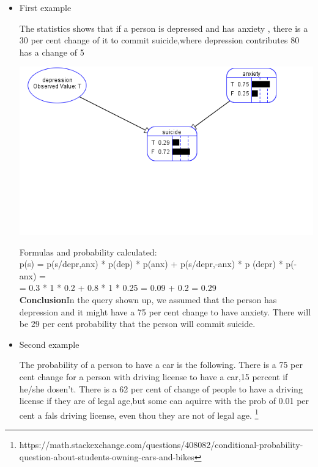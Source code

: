 \graphicspath{ {fig/} }
\begin{itemize}
\item{First example}

\tab The statistics shows that if a person is depressed and has anxiety , there is a 30 per cent change of it 
to commit suicide,where depression contributes 80%
has a change of 5%

\begin{center}
  	\includegraphics[scale=0.8]{ex111}
\end{center}

\tab Formulas and probability calculated:\\
\tab\tab p(s) = p(s/depr,anx) * p(dep) * p(anx) + p(s/depr,-anx) * p (depr) * p(-anx) =\\
\tab\tab = 0.3 * 1 * 0.2 + 0.8 * 1 * 0.25 = 0.09 + 0.2 = 0.29\\

\tab \textbf{Conclusion}In the query shown up, we assumed that the person has depression and it might have a 75 per cent change
to have anxiety. There will be 29 per cent probability that the person will commit suicide.\\

\item{Second example}

\tab The probability of a person to have a car is the following. There is a 75 per cent change for a person
with driving license to have a car,15 percent if he/she dosen't. There is a 62 per cent of change of people to have a driving license if they are of
legal age,but some can aquirre with the prob of 0.01 per cent a fals driving license, even thou they are not of legal age. 
\footnote{https://math.stackexchange.com/questions/408082/conditional-probability-question-about-students-owning-cars-and-bikes}


\end{itemize}
